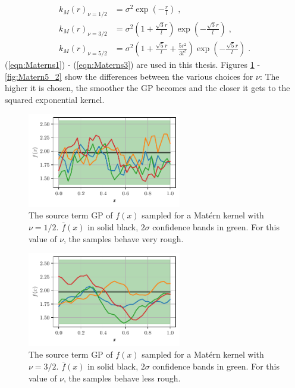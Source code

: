 \documentclass[%
  a4paper,oneside,%
  11pt,%
  smallchapters,
  style=printdev,
  extramargin,
  green,%
  rgb, <cmyk>
  ]{tubsbook}
\begin{document}
\begin{align}
k_{M}(r)_{\nu = 1/2} &=   \sigma^2 \exp(- \frac{r}{l})  \; , \\
\label{eqn:Materns1}
k_{M}(r)_{\nu = 3/2} &=  \sigma^2 \left(      1+ \frac{\sqrt{3}r}{l}  	\right)  \exp(- \frac{\sqrt{3} r}{l})  \; , \\
k_{M}(r)_{\nu = 5/2} &=  \sigma^2\left(      1+ \frac{\sqrt{5}r}{l}  + \frac{5r^2}{3l^2}	\right)  \exp(- \frac{\sqrt{5} r}{l}) \; .
\label{eqn:Materns3}
\end{align}
%
(\ref{eqn:Materns1}) - (\ref{eqn:Materns3}) are used in this thesis. Figures \ref{fig:Matern1_2} - \ref{fig:Matern5_2} show the differences between the various choices for $\nu$: The higher it is chosen, the smoother the GP becomes and the closer it gets to the squared exponential kernel.
\begin{figure}[!ht]
\begin{center}

\includegraphics[width=0.6\textwidth]{pics/matern1_2_f_sampled}
\caption[Samples from a GP with a Mat\'ern kernel 1]{The source term GP of $f(x)$ sampled for a Mat\'ern kernel with $\nu=1/2$. $\bar{f}(x)$ in solid black, $2\sigma$ confidence bands in green. For this value of $\nu$, the samples behave very rough.}
\label{fig:Matern1_2}

\end{center}
\end{figure}

\begin{figure}[!ht]
\begin{center}

\includegraphics[width=0.6\textwidth]{pics/matern3_2_f_sampled}
\caption[Samples from a GP with a Mat\'ern kernel 2]{The source term GP of $f(x)$ sampled for a Mat\'ern kernel with $\nu=3/2$. $\bar{f}(x)$ in solid black, $2\sigma$ confidence bands in green. For this value of $\nu$, the samples behave less rough.}
\label{fig:Matern3_2}

\end{center}
\end{figure}
\end{document}
